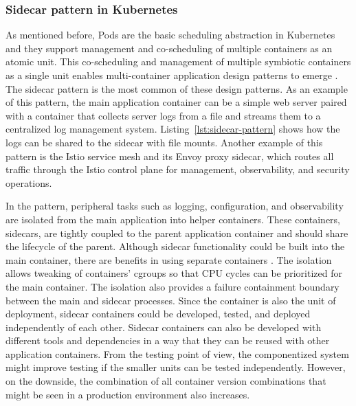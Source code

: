 \documentclass[english, 12pt, a4paper, sci, utf8, a-2b, online]{aaltothesis}
\begin{document}
\subsubsection{Sidecar pattern in Kubernetes}

As mentioned before, Pods are the basic scheduling abstraction in Kubernetes and they support management and co-scheduling of multiple containers as an atomic unit.
This co-scheduling and management of multiple symbiotic containers as a single unit enables multi-container application design patterns to emerge \cite{burns2016design}.
The sidecar pattern is the most common of these design patterns.
As an example of this pattern, the main application container can be a simple web server paired with a container that collects server logs from a file and streams them to a centralized log management system.
Listing~\ref{lst:sidecar-pattern} shows how the logs can be shared to the sidecar with file mounts.
Another example of this pattern is the Istio service mesh \cite{istio} and its Envoy proxy sidecar, which routes all traffic through the Istio control plane for management, observability, and security operations.



In the pattern, peripheral tasks such as logging, configuration, and observability are isolated from the main application into helper containers.
These containers, sidecars, are tightly coupled to the parent application container and should share the lifecycle of the parent.
Although sidecar functionality could be built into the main container, there are benefits in using separate containers \cite{burns2016design}.
The isolation allows tweaking of containers' cgroups so that CPU cycles can be prioritized for the main container.
The isolation also provides a failure containment boundary between the main and sidecar processes.
Since the container is also the unit of deployment, sidecar containers could be developed, tested, and deployed independently of each other.
Sidecar containers can also be developed with different tools and dependencies in a way that they can be reused with other application containers.
From the testing point of view, the componentized system might improve testing if the smaller units can be tested independently.
However, on the downside, the combination of all container version combinations that might be seen in a production environment also increases.
\end{document}

